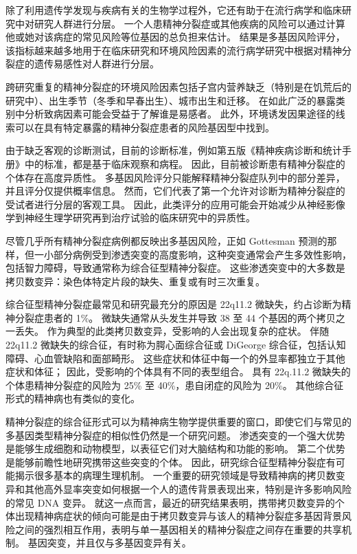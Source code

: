 除了利用遗传学发现与疾病有关的生物学过程外，它还有助于在流行病学和临床研究中对研究人群进行分层。 一个人患精神分裂症或其他疾病的风险可以通过计算他或她对该病症的常见风险等位基因的总负担来估计。 结果是多基因风险评分，该指标越来越多地用于在临床研究和环境风险因素的流行病学研究中根据对精神分裂症的遗传易感性对人群进行分层。

跨研究重复的精神分裂症的环境风险因素包括子宫内营养缺乏（特别是在饥荒后的研究中）、出生季节（冬季和早春出生）、城市出生和迁移。 在如此广泛的暴露类别中分析致病因素可能会受益于了解谁是易感者。 此外，环境诱发因果途径的线索可以在具有特定暴露的精神分裂症患者的风险基因型中找到。

由于缺乏客观的诊断测试，目前的诊断标准，例如第五版《精神疾病诊断和统计手册》中的标准，都是基于临床观察和病程。 因此，目前被诊断患有精神分裂症的个体存在高度异质性。 多基因风险评分只能解释精神分裂症队列中的部分差异，并且评分仅提供概率信息。 然而，它们代表了第一个允许对诊断为精神分裂症的受试者进行分层的客观工具。 因此，此类评分的应用可能会开始减少从神经影像学到神经生理学研究再到治疗试验的临床研究中的异质性。

尽管几乎所有精神分裂症病例都反映出多基因风险，正如 Gottesman 预测的那样，但一小部分病例受到渗透突变的高度影响，这种突变通常会产生多效性影响，包括智力障碍，导致通常称为综合征型精神分裂症。 这些渗透突变中的大多数是拷贝数变异：染色体特定片段的缺失、重复或有时三次重复。

综合征型精神分裂症最常见和研究最充分的原因是 22q11.2 微缺失，约占诊断为精神分裂症患者的 1\%。 微缺失通常从头发生并导致 38 至 44 个基因的两个拷贝之一丢失。 作为典型的此类拷贝数变异，受影响的人会出现复杂的症状。 伴随 22q11.2 微缺失的综合征，有时称为腭心面综合征或 DiGeorge 综合征，包括认知障碍、心血管缺陷和面部畸形。 这些症状和体征中每一个的外显率都独立于其他症状和体征； 因此，受影响的个体具有不同的表型组合。 具有 22q.11.2 微缺失的个体患精神分裂症的风险为 25\% 至 40\%，患自闭症的风险为 20\%。 其他综合征形式的精神病也有类似的变化。

精神分裂症的综合征形式可以为精神病生物学提供重要的窗口，即使它们与常见的多基因类型精神分裂症的相似性仍然是一个研究问题。 渗透突变的一个强大优势是能够生成细胞和动物模型，以表征它们对大脑结构和功能的影响。 第二个优势是能够前瞻性地研究携带这些突变的个体。 因此，研究综合征型精神分裂症有可能揭示很多基本的病理生理机制。 一个重要的研究领域是导致精神病的拷贝数变异和其他高外显率突变如何根据一个人的遗传背景表现出来，特别是许多影响风险的常见 DNA 变异。 就这一点而言，最近的研究结果表明，携带拷贝数变异的个体出现精神病症状的倾向可能是由于拷贝数变异与该人的精神分裂症多基因背景风险之间的强烈相互作用，表明与单一基因相关的精神分裂症之间存在重要的共享机制。 基因突变，并且仅与多基因变异有关。


